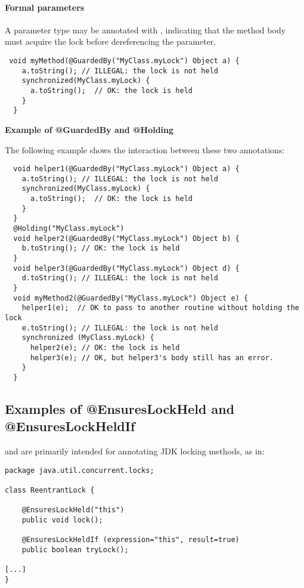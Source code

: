 \paragraph{Formal parameters\label{lock-examples-guardedby-formal-parameters}}

A parameter type may be annotated with , indicating that
the method body must acquire the lock before dereferencing the parameter.

\begin{Verbatim}
 void myMethod(@GuardedBy("MyClass.myLock") Object a) {
    a.toString(); // ILLEGAL: the lock is not held
    synchronized(MyClass.myLock) {
      a.toString();  // OK: the lock is held
    }
  }
\end{Verbatim}

\textbf{Example of @GuardedBy and @Holding}

The following example shows the interaction between these two annotations:

\begin{Verbatim}
  void helper1(@GuardedBy("MyClass.myLock") Object a) {
    a.toString(); // ILLEGAL: the lock is not held
    synchronized(MyClass.myLock) {
      a.toString();  // OK: the lock is held
    }
  }
  @Holding("MyClass.myLock")
  void helper2(@GuardedBy("MyClass.myLock") Object b) {
    b.toString(); // OK: the lock is held
  }
  void helper3(@GuardedBy("MyClass.myLock") Object d) {
    d.toString(); // ILLEGAL: the lock is not held
  }
  void myMethod2(@GuardedBy("MyClass.myLock") Object e) {
    helper1(e);  // OK to pass to another routine without holding the lock
    e.toString(); // ILLEGAL: the lock is not held
    synchronized (MyClass.myLock) {
      helper2(e); // OK: the lock is held
      helper3(e); // OK, but helper3's body still has an error.
    }
  }
\end{Verbatim}

\subsection{Examples of @EnsuresLockHeld and @EnsuresLockHeldIf\label{ensureslockheld-examples}}

 and  are primarily intended
for annotating JDK locking methods, as in:

\begin{Verbatim}
package java.util.concurrent.locks;

class ReentrantLock {

    @EnsuresLockHeld("this")
    public void lock();

    @EnsuresLockHeldIf (expression="this", result=true)
    public boolean tryLock();

[...]
}
\end{Verbatim}

